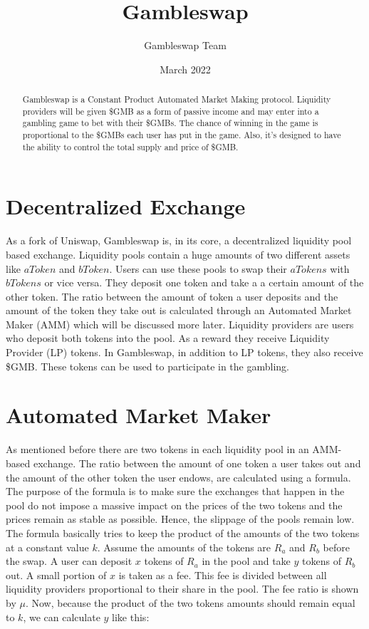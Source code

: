 \documentclass{article}
\title{Gambleswap}
\author{Gambleswap Team}
\date{March 2022}
\begin{document}
\maketitle

\begin{abstract}

Gambleswap is a Constant Product Automated Market Making protocol. Liquidity providers will be given \$GMB as a form of passive income and may enter into a gambling game to bet with their \$GMBs. 
The chance of winning in the game is proportional to the \$GMBs each user has put in the game. Also, it's designed to have the ability to control the total supply and price of \$GMB.

\end{abstract}
\section{Decentralized Exchange}
As a fork of Uniswap, Gambleswap is, in its core, a decentralized liquidity pool based exchange. Liquidity pools contain a huge amounts of two different assets like $aToken$ and $bToken$. 
Users can use these pools to swap their $aTokens$ with $bTokens$ or vice versa. They deposit one token and take a a certain amount of the other token. The ratio between the amount of token a user deposits and the amount of the token they take out is calculated through an Automated Market Maker (AMM) which will be discussed more later.
Liquidity providers are users who deposit both tokens into the pool. As a reward they receive Liquidity Provider (LP) tokens. In Gambleswap, in addition to LP tokens, they also receive \$GMB. These tokens can be used to participate in the gambling. 
\section{Automated Market Maker}
As mentioned before there are two tokens in each liquidity pool in an AMM-based exchange. The ratio between the amount of one token a user takes out and the amount of the other token the user endows, are calculated using a formula. The purpose of the formula is to make sure the exchanges that happen in the pool do not impose a massive impact on the prices of the two tokens and the prices remain as stable as possible. Hence, the slippage of the pools remain low. 
The formula basically tries to keep the product of the amounts of the two tokens at a constant value $k$.
Assume the amounts of the tokens are $R_a$ and $R_b$ before the swap. A user can deposit $x$ tokens of $R_a$ in the pool and take $y$ tokens of $R_b$ out. 
A small portion of $x$ is taken as a fee. This fee is divided between all liquidity providers proportional to their share in the pool. The fee ratio is shown by $\mu$. Now, because the product of the two tokens amounts should remain equal to $k$, we can calculate $y$ like this:
\end{document}
